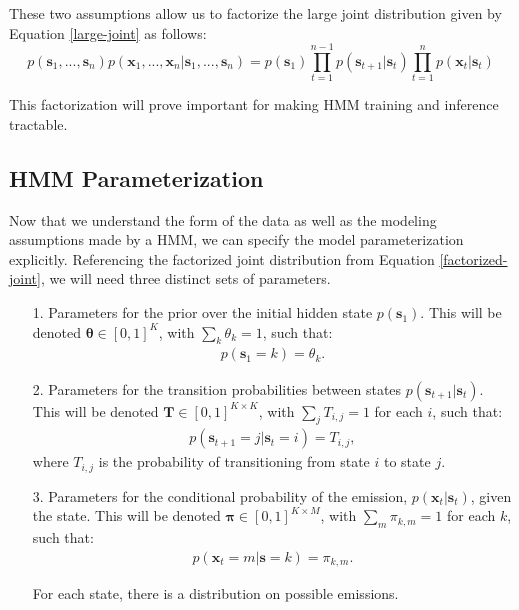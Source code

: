 
          These two assumptions allow us to factorize the large joint distribution given by Equation \ref{large-joint} as follows:
\begin{equation} \label{factorized-joint}
	p(\textbf{s}_1, ..., \textbf{s}_n) p(\textbf{x}_1, ..., \textbf{x}_n | \textbf{s}_1, ..., \textbf{s}_n) = p(\textbf{s}_1) \prod_{t=1}^{n-1} p(\textbf{s}_{t+1} | \textbf{s}_t) \prod_{t=1}^{n} p(\textbf{x}_t | \textbf{s}_t)
      \end{equation}
      
This factorization will prove important for making HMM training and inference tractable.

\subsection{HMM Parameterization} \label{hmm-parameterization}

Now that we understand the form of the data as well as the modeling assumptions made by a HMM, we can specify the model parameterization explicitly. Referencing the factorized joint distribution from Equation \ref{factorized-joint}, we will need three distinct sets of parameters.
%
\begin{itemize}
	\item[1.]  Parameters for the prior over the initial hidden state $p(\textbf{s}_1)$. This will be denoted $\boldsymbol{\theta} \in [0,1]^{K}$, with $\sum_k\theta_k=1$, such that:
	\begin{align*}
		p(\textbf{s}_1 = k) = \theta_k.
	\end{align*}
%
	\item[2.] Parameters for the transition probabilities between states $p(\textbf{s}_{t+1} | \textbf{s}_t)$. This will be denoted $\textbf{T} \in [0,1]^{K \times K}$, with $\sum_j T_{i,j}=1$ for each $i$, such that:
	\begin{align*}
		p(\textbf{s}_{t+1} = j | \textbf{s}_t = i) = T_{i,j},
	\end{align*}
	where $T_{i,j}$ is the probability of transitioning from state $i$ to state $j$.
%
	\item[3.] Parameters for the conditional probability of the emission, $p(\textbf{x}_t | \textbf{s}_t)$,  given the state. This will be denoted $\boldsymbol{\pi} \in [0,1]^{K \times M}$, with $\sum_m \pi_{k,m}=1$ for each $k$, such that:
	\begin{align*}
		p(\textbf{x}_t = m | \textbf{s} = k) = \pi_{k, m}.
	\end{align*}

	For each state, there is a distribution on possible emissions.
\end{itemize}

